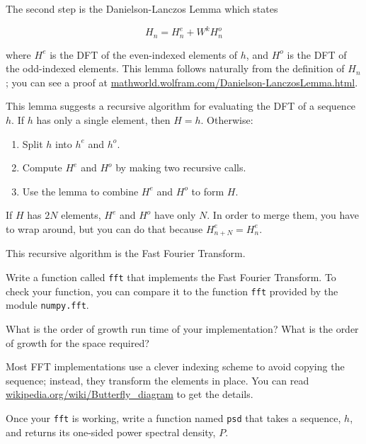 \documentclass[10pt]{book}
\begin{document}
The second step is the Danielson-Lanczos Lemma which states

\[ H_n = H^e_n + W^k H^o_n \]

where $H^e$ is the DFT of the even-indexed elements
of $h$, and $H^o$ is the DFT of the odd-indexed elements.
This lemma follows naturally from the definition of $H_n$; you can see
a proof at \url{mathworld.wolfram.com/Danielson-LanczosLemma.html}.

This lemma suggests a recursive algorithm for evaluating the DFT
of a sequence $h$.  If  $h$ has only a single element, then $H=h$.
Otherwise:

\begin{enumerate}

\item Split $h$ into $h^e$ and $h^o$.

\item Compute $H^e$ and $H^o$ by making two recursive calls.

\item Use the lemma to combine $H^e$ and $H^o$ to form $H$.

\end{enumerate}

If $H$ has $2N$ elements, $H^e$ and $H^o$ have only $N$.
In order to merge them, you have to wrap around, but you
can do that because $H^e_{n+N} = H^e_{n}$.

This recursive algorithm is the Fast Fourier Transform.

\begin{ex}

Write a function called {\tt fft} that implements
the Fast Fourier Transform.  To check your function, you
can compare it to the function {\tt fft} provided by
the module {\tt numpy.fft}.

What is the order of growth run time of your implementation?
What is the order of growth for the space required?

\end{ex}

Most FFT implementations use a clever indexing scheme to avoid copying
the sequence; instead, they transform the elements in place.  You can
read \url{wikipedia.org/wiki/Butterfly_diagram} to get the details.

\begin{ex}

Once your {\tt fft} is working, write a function named
{\tt psd} that takes a sequence, $h$, and returns its
one-sided power spectral density, $P$.

\end{ex}
\end{document}
